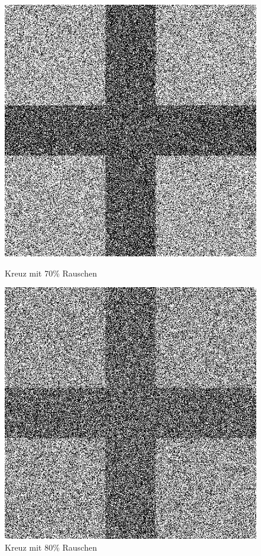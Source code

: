 \begin{figure}[hbt]
	\begin{minipage}{0.49 \textwidth}
		\includegraphics[width=\textwidth]{./Bilder/Auswertung/BeispielBilder/Picture_Crossing_noise_70_pixelCnt_128_featureCnt_5}
		\caption{Kreuz mit 70\% Rauschen}
	\end{minipage}
	\hfill
	\begin{minipage}{0.49 \textwidth}
		\includegraphics[width=\textwidth]{./Bilder/Auswertung/BeispielBilder/Picture_Crossing_noise_80_pixelCnt_128_featureCnt_5}
		\caption{Kreuz mit 80\% Rauschen}
	\end{minipage}
\end{figure}

